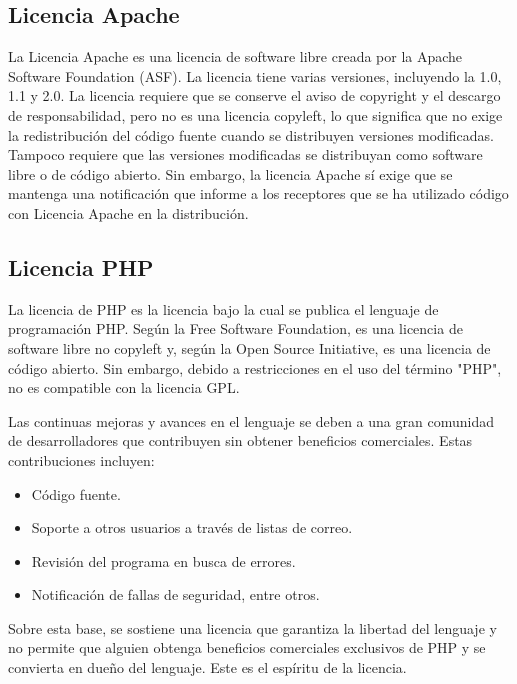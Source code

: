			\subsection{Licencia Apache}\label{apsl}
			
				La Licencia Apache es una licencia de software libre creada por la Apache Software Foundation (ASF). La licencia tiene varias versiones, incluyendo la 1.0, 1.1 y 2.0. La licencia requiere que se conserve el aviso de copyright y el descargo de responsabilidad, pero no es una licencia copyleft, lo que significa que no exige la redistribución del código fuente cuando se distribuyen versiones modificadas. Tampoco requiere que las versiones modificadas se distribuyan como software libre o de código abierto. Sin embargo, la licencia Apache sí exige que se mantenga una notificación que informe a los receptores que se ha utilizado código con Licencia Apache en la distribución.\par
				
			\subsection{Licencia PHP}
			
				La licencia de PHP es la licencia bajo la cual se publica el lenguaje de programación PHP. Según la Free Software Foundation, es una licencia de software libre no copyleft y, según la Open Source Initiative, es una licencia de código abierto. Sin embargo, debido a restricciones en el uso del término "PHP", no es compatible con la licencia GPL.\par 
				Las continuas mejoras y avances en el lenguaje se deben a una gran comunidad de desarrolladores que contribuyen sin obtener beneficios comerciales. Estas contribuciones incluyen:
				
				\begin{itemize}
					\item Código fuente.
    				\item Soporte a otros usuarios a través de listas de correo.
   					\item Revisión del programa en busca de errores.
    				\item Notificación de fallas de seguridad, entre otros.
				\end{itemize}
				
				Sobre esta base, se sostiene una licencia que garantiza la libertad del lenguaje y no permite que alguien obtenga beneficios comerciales exclusivos de PHP y se convierta en dueño del lenguaje. Este es el espíritu de la licencia.\par

